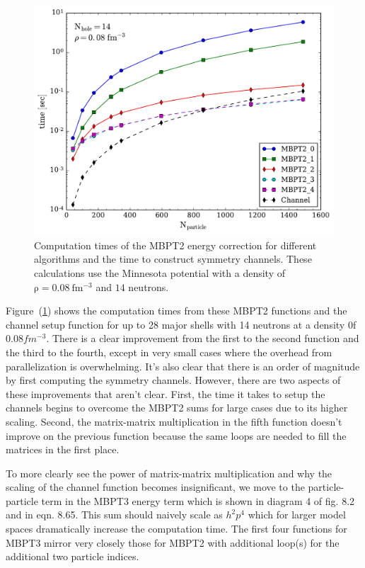 \begin{figure}
  \includegraphics[width=\linewidth]{Chapter8-figures/MBPT2fig.pdf}
  \caption{Computation times of the MBPT2 energy correction for different algorithms and the time to construct symmetry channels. These calculations use the Minnesota potential with a density of $\mathrm{\rho=0.08\ fm^{-3}}$ and $\mathrm{14}$ neutrons.}
  \label{fig:fig5}
\end{figure}

Figure~(\ref{fig:fig5}) shows the computation times from these MBPT2 functions and the channel setup function for up to 28 major shells with 14 neutrons at a density 0f $0.08 fm^{-3}$. There is a clear improvement from the first to the second function and the third to the fourth, except in very small cases where the overhead from parallelization is overwhelming. It's also clear that there is an order of magnitude by first computing the symmetry channels. However, there are two aspects of these improvements that aren't clear. First, the time it takes to setup the channels begins to overcome the MBPT2 sums for large cases due to its higher scaling. Second, the matrix-matrix multiplication in the fifth function doesn't improve on the previous function because the same loops are needed to fill the matrices in the first place.

To more clearly see the power of matrix-matrix multiplication and why the scaling of the channel function becomes insignificant, we move to the particle-particle term in the MBPT3 energy term which is shown in diagram 4 of fig. 8.2 and in eqn. 8.65. This sum should naively scale as $h^2p^4$ which for larger model spaces dramatically increase the computation time. The first four functions for MBPT3 mirror very closely those for MBPT2 with additional loop(s) for the additional two particle indices.

